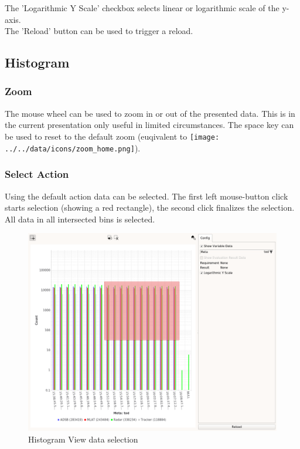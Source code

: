 The 'Logarithmic Y Scale' checkbox selects linear or logarithmic scale of the y-axis. \\

The 'Reload' button can be used to trigger a reload.

\subsection{Histogram}

\subsubsection{Zoom}

The mouse wheel can be used to zoom in or out of the presented data. This is in the current presentation only useful in limited circumstances. The space key can be used to reset to the default zoom (euqivalent to \texttt{[image: ../../data/icons/zoom\_home.png]}).

\subsubsection{Select Action}

Using the default action data can be selected. The first left mouse-button click starts selection (showing a red rectangle), the second click finalizes the selection. All data in all intersected bins is selected.

\begin{figure}[H]
    \hspace*{-2cm}
    \includegraphics[width=18cm,frame]{../screenshots/histogram_select.png}
  \caption{Histogram View data selection}
\end{figure}

